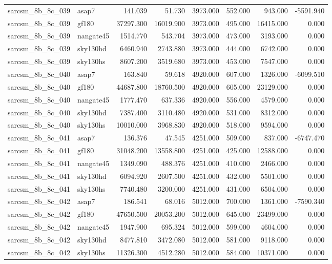 \begin{tabular}{llrrrrrr}
sarcsm\_8b\_8c\_039 & asap7 & 141.039 & 51.730 & 3973.000 & 552.000 & 943.000 & -5591.940 \\
sarcsm\_8b\_8c\_039 & gf180 & 37297.300 & 16019.900 & 3973.000 & 495.000 & 16415.000 & 0.000 \\
sarcsm\_8b\_8c\_039 & nangate45 & 1514.770 & 543.704 & 3973.000 & 473.000 & 3193.000 & 0.000 \\
sarcsm\_8b\_8c\_039 & sky130hd & 6460.940 & 2743.880 & 3973.000 & 444.000 & 6742.000 & 0.000 \\
sarcsm\_8b\_8c\_039 & sky130hs & 8607.200 & 3519.680 & 3973.000 & 453.000 & 7547.000 & 0.000 \\
sarcsm\_8b\_8c\_040 & asap7 & 163.840 & 59.618 & 4920.000 & 607.000 & 1326.000 & -6099.510 \\
sarcsm\_8b\_8c\_040 & gf180 & 44687.800 & 18760.500 & 4920.000 & 605.000 & 23129.000 & 0.000 \\
sarcsm\_8b\_8c\_040 & nangate45 & 1777.470 & 637.336 & 4920.000 & 556.000 & 4579.000 & 0.000 \\
sarcsm\_8b\_8c\_040 & sky130hd & 7387.400 & 3110.480 & 4920.000 & 531.000 & 8312.000 & 0.000 \\
sarcsm\_8b\_8c\_040 & sky130hs & 10010.000 & 3968.830 & 4920.000 & 518.000 & 9594.000 & 0.000 \\
sarcsm\_8b\_8c\_041 & asap7 & 136.376 & 47.545 & 4251.000 & 509.000 & 837.000 & -6747.470 \\
sarcsm\_8b\_8c\_041 & gf180 & 31048.200 & 13558.800 & 4251.000 & 425.000 & 12588.000 & 0.000 \\
sarcsm\_8b\_8c\_041 & nangate45 & 1349.090 & 488.376 & 4251.000 & 410.000 & 2466.000 & 0.000 \\
sarcsm\_8b\_8c\_041 & sky130hd & 6094.920 & 2607.500 & 4251.000 & 432.000 & 5501.000 & 0.000 \\
sarcsm\_8b\_8c\_041 & sky130hs & 7740.480 & 3200.000 & 4251.000 & 431.000 & 6504.000 & 0.000 \\
sarcsm\_8b\_8c\_042 & asap7 & 186.541 & 68.016 & 5012.000 & 700.000 & 1361.000 & -7590.340 \\
sarcsm\_8b\_8c\_042 & gf180 & 47650.500 & 20053.200 & 5012.000 & 645.000 & 23499.000 & 0.000 \\
sarcsm\_8b\_8c\_042 & nangate45 & 1947.900 & 695.324 & 5012.000 & 599.000 & 4604.000 & 0.000 \\
sarcsm\_8b\_8c\_042 & sky130hd & 8477.810 & 3472.080 & 5012.000 & 581.000 & 9118.000 & 0.000 \\
sarcsm\_8b\_8c\_042 & sky130hs & 11326.300 & 4512.280 & 5012.000 & 584.000 & 10371.000 & 0.000 \\

\end{tabular}
